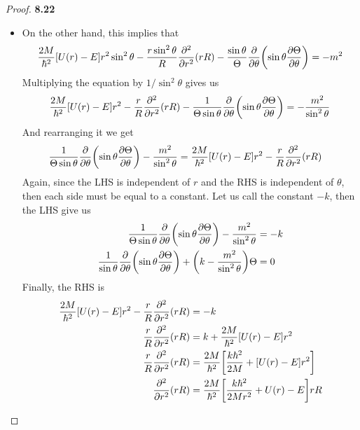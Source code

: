 \documentclass[11pt]{article}
\theoremstyle{definition}
\begin{document}
\begin{proof}{\textbf{8.22}}
\begin{itemize}
\item [\textbf{(b)}] On the other hand, this implies that
\begin{align*}
    \frac{2M}{\hbar^2}[U(r) - E]r^2\sin^2\theta
    - \frac{r\sin^2\theta}{R}\pdv[2]{r}(rR)
    - \frac{\sin\theta}{\Theta}\pdv{\theta}(\sin\theta\pdv{\Theta}{\theta})
    = -m^2
\end{align*}
Multiplying the equation by $1/\sin^2\theta$ gives us
\begin{align*}
    \frac{2M}{\hbar^2}[U(r) - E]r^2
    - \frac{r}{R}\pdv[2]{r}(rR)
    - \frac{1}{\Theta\sin\theta}\pdv{\theta}(\sin\theta\pdv{\Theta}{\theta})
    = -\frac{m^2}{\sin^2\theta}
\end{align*}
And rearranging it we get
\begin{align*}
    \frac{1}{\Theta\sin\theta}\pdv{\theta}(\sin\theta\pdv{\Theta}{\theta})
    -\frac{m^2}{\sin^2\theta}
    &= \frac{2M}{\hbar^2}[U(r) - E]r^2 - \frac{r}{R}\pdv[2]{r}(rR)
\end{align*}
Again, since the LHS is independent of $r$ and the RHS is independent of
$\theta$, then each side must be equal to a constant. Let us call the constant
$-k$, then the LHS give us
\begin{align*}
    \frac{1}{\Theta\sin\theta}\pdv{\theta}(\sin\theta\pdv{\Theta}{\theta})
    -\frac{m^2}{\sin^2\theta} &= -k\\
    \frac{1}{\sin\theta}\pdv{\theta}(\sin\theta\pdv{\Theta}{\theta})
    + \bigg(k-\frac{m^2}{\sin^2\theta}\bigg)\Theta &= 0
\end{align*}
Finally, the RHS is
\begin{align*}
    \frac{2M}{\hbar^2}[U(r) - E]r^2 - \frac{r}{R}\pdv[2]{r}(rR) &= -k\\
    \frac{r}{R}\pdv[2]{r}(rR) &= k + \frac{2M}{\hbar^2}[U(r) - E]r^2\\
    \frac{r}{R}\pdv[2]{r}(rR)
    &= \frac{2M}{\hbar^2}\bigg[\frac{k\hbar^2}{2M} + [U(r) - E]r^2\bigg]\\
    \pdv[2]{r}(rR)
    &= \frac{2M}{\hbar^2}\bigg[\frac{k\hbar^2}{2Mr^2} + U(r) - E\bigg]rR
\end{align*}
\end{itemize}
\end{proof}
\end{document}
